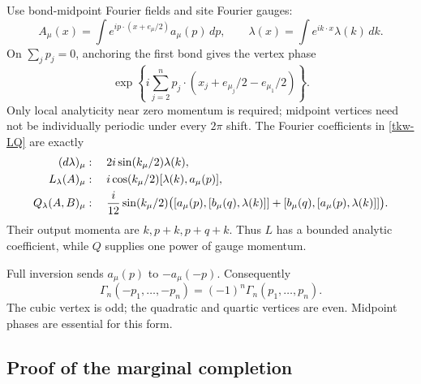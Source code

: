 \documentclass[11pt]{article}
\theoremstyle{remark}
\begin{document}
Use bond-midpoint Fourier fields and site Fourier gauges:
\[
 A_\mu(x)=\int e^{ip\cdot(x+e_\mu/2)}a_\mu(p)\,dp,
 \qquad \lambda(x)=\int e^{ik\cdot x}\lambda(k)\,dk .
\]
On \(\sum_jp_j=0\), anchoring the first bond gives the vertex phase
\begin{equation}
 \exp\!\left\{i\sum_{j=2}^n
   p_j\cdot(x_j+e_{\mu_j}/2-e_{\mu_1}/2)\right\}.
 \label{tkw-vertex-phase}
\end{equation}
Only local analyticity near zero momentum is required; midpoint
vertices need not be individually periodic under every \(2\pi\)
shift. The Fourier coefficients in \eqref{tkw-LQ} are exactly
\begin{align}
 (d\lambda)_\mu&:\quad
       2i\sin(k_\mu/2)\lambda(k),\notag\\
 L_\lambda(A)_\mu&:\quad
       i\cos(k_\mu/2)[\lambda(k),a_\mu(p)],\notag\\
 Q_\lambda(A,B)_\mu&:\quad
       \frac{i}{12}\sin(k_\mu/2)
       \bigl([a_\mu(p),[b_\mu(q),\lambda(k)]]
           +[b_\mu(q),[a_\mu(p),\lambda(k)]]\bigr).
 \label{tkw-generator-phases}
\end{align}
Their output momenta are \(k,p+k,p+q+k\). Thus \(L\) has
a bounded analytic coefficient, while \(Q\) supplies one
power of gauge momentum.

Full inversion sends \(a_\mu(p)\) to \(-a_\mu(-p)\).
Consequently
\begin{equation}
 \Gamma_n(-p_1,\ldots,-p_n)
        =(-1)^n\Gamma_n(p_1,\ldots,p_n).
 \label{tkw-parity}
\end{equation}
The cubic vertex is odd; the quadratic and quartic vertices
are even. Midpoint phases are essential for this form.

\subsection{Proof of the marginal completion}
\label{tkw-completion-proof}
\end{document}
